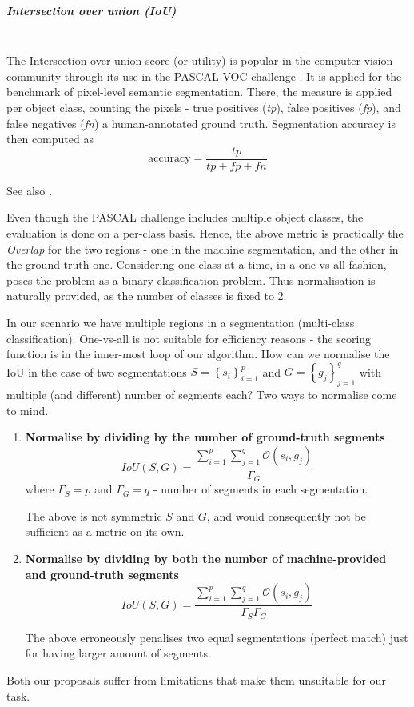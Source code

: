 \subparagraph{Intersection over union (IoU)}\mbox{}\\
The Intersection over union score (or utility) %
is popular in the computer vision community through its use in the PASCAL VOC challenge \cite{PASCAL-voc-2012}. It is applied for the benchmark of pixel-level semantic segmentation. There, the measure is applied per object class, counting the pixels - true positives (\textit{tp}), false positives (\textit{fp}), and false negatives (\textit{fn}) \wrt a human-annotated ground truth. Segmentation accuracy is then computed as
\[
 \text{accuracy} = \frac{\textit{tp}}{\textit{tp} + \textit{fp} + \textit{fn}}
\]

See also .

Even though the PASCAL challenge includes multiple object classes, the evaluation is done on a per-class basis. Hence, the above metric is practically the {\it Overlap} for the two regions - one in the machine segmentation, and the other in the ground truth one. 
Considering one class at a time, in a one-vs-all fashion, poses the problem as a binary classification problem. Thus normalisation is naturally provided, as the number of classes is fixed to 2.

In our scenario we have multiple regions in a segmentation (multi-class classification). One-vs-all is not suitable for efficiency reasons - the scoring function is in the inner-most loop of our algorithm. How can we normalise the IoU in the case of two segmentations $S=\left\{ {s_{i}}\right\} _{i=1}^{p}$
and $G=\left\{ {g_{j}}\right\} _{j=1}^{q}$ with multiple (and different) number of segments each? Two ways to normalise come to mind.

\begin{enumerate}
\item{\textbf{Normalise by dividing by the number of ground-truth segments}}
\[
IoU(S,G)=\frac{\sum\limits _{i=1}^{p}\sum\limits _{j=1}^{q}\mathcal{O}\left(s_{i},g_{j}\right)}{\Gamma_{G}}
\]
where $\Gamma_{S}=p$ and $\Gamma_{G}=q$ - number of segments in each segmentation.

The above is not symmetric \wrt $S$ and $G$, and would consequently not be sufficient as a metric on its own.

\item{\textbf{Normalise by dividing by both the number of machine-provided and ground-truth segments}}
\[
IoU(S,G)=\frac{\sum\limits _{i=1}^{p}\sum\limits _{j=1}^{q}\mathcal{O}\left(s_{i},g_{j}\right)}{\Gamma_{S}\Gamma_{G}}
\]

The above erroneously penalises two equal segmentations (perfect match) just for having larger amount of segments.
\end{enumerate}
Both our proposals suffer from limitations that make them unsuitable for our task.

